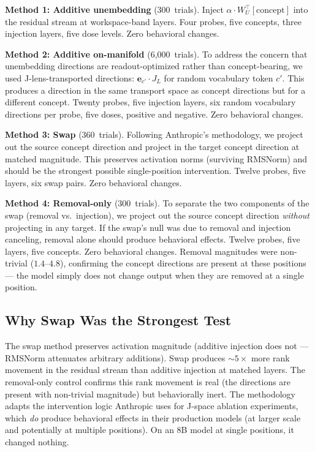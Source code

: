 \documentclass[11pt,a4paper]{article}
\begin{document}
\textbf{Method 1: Additive unembedding} (300~trials). Inject
$\alpha \cdot W_U^\top[\text{concept}]$ into the residual stream at
workspace-band layers. Four probes, five concepts, three injection
layers, five dose levels. Zero behavioral changes.

\textbf{Method 2: Additive on-manifold} (6{,}000~trials). To address
the concern that unembedding directions are readout-optimized rather
than concept-bearing, we used J-lens-transported directions:
$\mathbf{e}_{c'} \cdot J_L$ for random vocabulary token $c'$. This
produces a direction in the same transport space as concept directions
but for a different concept. Twenty probes, five injection layers,
six random vocabulary directions per probe, five doses, positive and
negative. Zero behavioral changes.

\textbf{Method 3: Swap} (360~trials). Following Anthropic's
methodology, we project out the source concept direction and project in
the target concept direction at matched magnitude. This preserves
activation norms (surviving RMSNorm) and should be the strongest
possible single-position intervention. Twelve probes, five layers, six
swap pairs. Zero behavioral changes.

\textbf{Method 4: Removal-only} (300~trials). To separate the two
components of the swap (removal vs.\ injection), we project out the
source concept direction \emph{without} projecting in any target.
If the swap's null was due to removal and injection canceling, removal
alone should produce behavioral effects. Twelve probes, five layers,
five concepts. Zero behavioral changes. Removal magnitudes were
non-trivial ($1.4$--$4.8$), confirming the concept directions are
present at these positions --- the model simply does not change output
when they are removed at a single position.

\subsection{Why Swap Was the Strongest Test}

The swap method preserves activation magnitude (additive injection does
not --- RMSNorm attenuates arbitrary additions). Swap produces
${\sim}5\times$ more rank movement in the residual stream than additive
injection at matched layers. The removal-only control confirms this
rank movement is real (the directions are present with non-trivial
magnitude) but behaviorally inert. The methodology adapts the
intervention logic Anthropic uses for J-space ablation experiments,
which \emph{do} produce behavioral effects in their production
models (at larger scale and potentially at multiple positions). On an 8B
model at single positions, it changed nothing.
\end{document}
